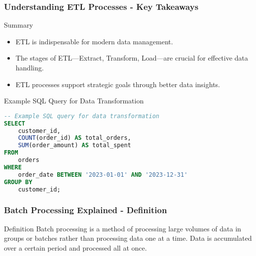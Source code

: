 \documentclass[aspectratio=169]{beamer}
\begin{document}
\begin{frame}[fragile]
    \frametitle{Understanding ETL Processes - Key Takeaways}
    \begin{block}{Summary}
        \begin{itemize}
            \item ETL is indispensable for modern data management.
            \item The stages of ETL—Extract, Transform, Load—are crucial for effective data handling.
            \item ETL processes support strategic goals through better data insights.
        \end{itemize}
    \end{block}

    \begin{block}{Example SQL Query for Data Transformation}
        \begin{lstlisting}[language=SQL]
-- Example SQL query for data transformation
SELECT 
    customer_id,
    COUNT(order_id) AS total_orders,
    SUM(order_amount) AS total_spent
FROM 
    orders
WHERE 
    order_date BETWEEN '2023-01-01' AND '2023-12-31'
GROUP BY 
    customer_id;
        \end{lstlisting}
    \end{block}
\end{frame}

\begin{frame}[fragile]
    \frametitle{Batch Processing Explained - Definition}
    \begin{block}{Definition}
        Batch processing is a method of processing large volumes of data in groups or batches rather than processing data one at a time.
        Data is accumulated over a certain period and processed all at once.
    \end{block}
\end{frame}
\end{document}
